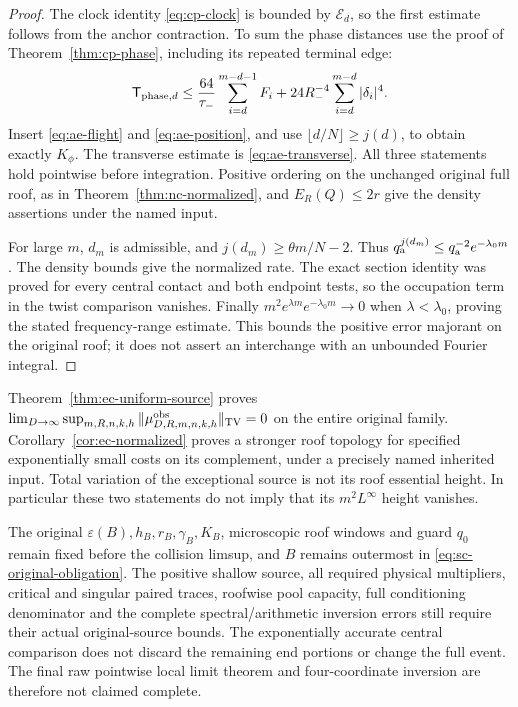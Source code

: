 \begin{proof}
The clock identity \eqref{eq:cp-clock} is bounded by
$\mathcal E_d$, so the first estimate follows from the anchor
contraction.  To sum the phase distances use the proof of
Theorem~\ref{thm:cp-phase}, including its repeated terminal edge:
\[
 \mathsf T_{{\rm phase},d}
 \le\frac{64}{\tau_-}\sum_{i=d}^{m-d-1}F_i
                +24R_-^{-4}\sum_{i=d}^{m-d}|\delta_i|^4.
\]
Insert \eqref{eq:ae-flight} and \eqref{eq:ae-position}, and use
$\lfloor d/N\rfloor\ge j(d)$, to obtain exactly $K_\phi$.
The transverse estimate is \eqref{eq:ae-transverse}.
All three statements hold pointwise before integration.
Positive ordering on the unchanged original full roof, as in
Theorem~\ref{thm:nc-normalized}, and $E_R(Q)\le2r$ give the
density assertions under the named input.

For large $m$, $d_m$ is admissible, and
$j(d_m)\ge\theta m/N-2$.  Thus
$q_{\rm a}^{j(d_m)}\le q_{\rm a}^{-2}e^{-\lambda_0m}$.
The density bounds give the normalized rate.  The exact section
identity was proved for every central contact and both endpoint
tests, so the occupation term in the twist comparison vanishes.
Finally $m^2e^{\lambda m}e^{-\lambda_0m}\to0$ when
$\lambda<\lambda_0$, proving the stated frequency-range estimate.
This bounds the positive error majorant on the original roof; it
does not assert an interchange with an unbounded Fourier integral.
\end{proof}

\begin{remark}
\label{rem:ec-original-limit}
Theorem~\ref{thm:ec-uniform-source} proves
$\lim_{D\to\infty}\sup_{m,R,n,k,h}
 \|\mu^{\rm obs}_{D,R,m,n,k,h}\|_{\rm TV}=0$
on the entire original family.  Corollary~\ref{cor:ec-normalized}
proves a stronger roof topology for specified exponentially small
costs on its complement, under a precisely named inherited input.
Total variation of the exceptional source is not its roof essential
height.  In particular these two statements do not imply that its
$m^2L^\infty$ height vanishes.

The original $\varepsilon(B),h_B,r_B,\gamma_B,K_B$, microscopic
roof windows and guard $q_0$ remain fixed before the collision
limsup, and $B$ remains outermost in
\eqref{eq:sc-original-obligation}.  The positive shallow source,
all required physical multipliers, critical and singular paired
traces, roofwise pool capacity, full conditioning denominator and
the complete spectral/arithmetic inversion errors still require
their actual original-source bounds.  The exponentially accurate
central comparison does not discard the remaining end portions or
change the full event.  The final raw pointwise local limit theorem
and four-coordinate inversion are therefore not claimed complete.
\end{remark}
